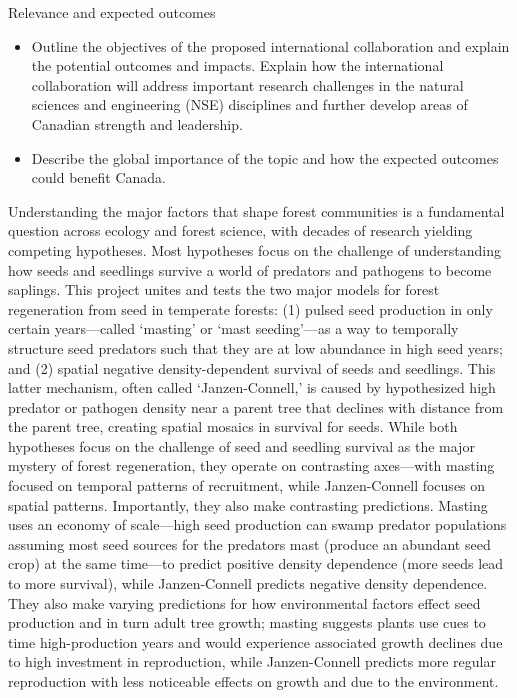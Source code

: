 \documentclass[12pt,oneside]{article}
\newenvironment{smitemize}{
\begin{itemize}
  \setlength{\itemsep}{1pt}
  \setlength{\parskip}{0pt}
  \setlength{\parsep}{0pt}}
{\end{itemize}
}
\begin{document}
{\sc Relevance and expected outcomes} 
\vspace{-1ex}
\begin{smitemize}
\item Outline the objectives of the proposed international collaboration and explain the potential outcomes and impacts. Explain how the international collaboration will address important research challenges in the natural sciences and engineering (NSE) disciplines and further develop areas of Canadian strength and leadership. 
\item Describe the global importance of the topic and how the expected outcomes could benefit Canada.
\end{smitemize}
Understanding the major factors that shape forest communities is a fundamental question across ecology and forest science, with decades of research yielding competing hypotheses. Most hypotheses focus on the challenge of understanding how seeds and seedlings survive a world of predators and pathogens to become saplings.\cite{janzen1971seed,connell1983prevalence,comita2014testing,davies2024seed} This project unites and tests the two major models for forest regeneration from seed in temperate forests: (1) pulsed seed production in only certain years---called `masting' or `mast seeding'---as a way to temporally structure seed predators such that they are at low abundance in high seed years;\cite{koenig2021brief,pearse2016mechanisms} and (2) spatial negative density-dependent survival of seeds and seedlings.\cite{connell1983prevalence,comita2014testing} This latter mechanism, often called `Janzen-Connell,' is caused by hypothesized high predator or pathogen density near a parent tree that declines with distance from the parent tree, creating spatial mosaics in survival for seeds.\cite{janzen1970herbivores,connell1983prevalence} While both hypotheses focus on the challenge of seed and seedling survival as the major mystery of forest regeneration, they operate on contrasting axes---with masting focused on temporal patterns of recruitment,\cite{pearse2017inter} while Janzen-Connell focuses on spatial patterns. Importantly, they also make contrasting predictions. Masting uses an economy of scale---high seed production can swamp predator populations assuming most seed sources for the predators mast (produce an abundant seed crop) at the same time---to predict positive density dependence (more seeds lead to more survival), while Janzen-Connell predicts negative density dependence. They also make varying predictions for how environmental factors effect seed production and in turn adult tree growth; masting suggests plants use cues to time high-production years and would experience associated growth declines due to high investment in reproduction,\cite{koenig1998scale,hacket2016tree,pearse2016mechanisms,bogdziewicz2021climate} while Janzen-Connell predicts more regular reproduction with less noticeable effects on growth and due to the environment. 
\end{document}
